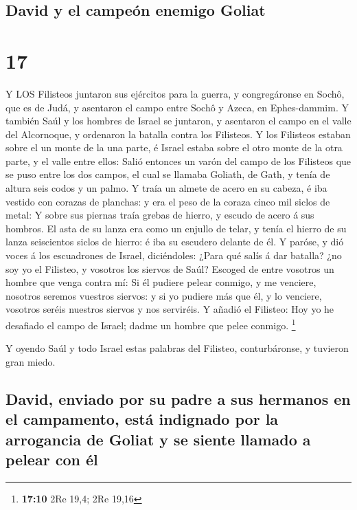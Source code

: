 \hypertarget{david-y-el-campeuxf3n-enemigo-goliat}{%
\subsection{David y el campeón enemigo
Goliat}\label{david-y-el-campeuxf3n-enemigo-goliat}}

\hypertarget{section-16}{%
\section{17}\label{section-16}}

 Y LOS Filisteos juntaron sus ejércitos para la guerra, y
congregáronse en Sochô, que es de Judá, y asentaron el campo entre Sochô
y Azeca, en Ephes-dammim.  Y también Saúl y los hombres de
Israel se juntaron, y asentaron el campo en el valle del Alcornoque, y
ordenaron la batalla contra los Filisteos.  Y los Filisteos
estaban sobre el un monte de la una parte, é Israel estaba sobre el otro
monte de la otra parte, y el valle entre ellos:  Salió
entonces un varón del campo de los Filisteos que se puso entre los dos
campos, el cual se llamaba Goliath, de Gath, y tenía de altura seis
codos y un palmo.  Y traía un almete de acero en su cabeza,
é iba vestido con corazas de planchas: y era el peso de la coraza cinco
mil siclos de metal:  Y sobre sus piernas traía grebas de
hierro, y escudo de acero á sus hombros.  El asta de su
lanza era como un enjullo de telar, y tenía el hierro de su lanza
seiscientos siclos de hierro: é iba su escudero delante de él.
 Y paróse, y dió voces á los escuadrones de Israel,
diciéndoles: ¿Para qué salís á dar batalla? ¿no soy yo el Filisteo, y
vosotros los siervos de Saúl? Escoged de entre vosotros un hombre que
venga contra mí:  Si él pudiere pelear conmigo, y me
venciere, nosotros seremos vuestros siervos: y si yo pudiere más que él,
y lo venciere, vosotros seréis nuestros siervos y nos serviréis.
 Y añadió el Filisteo: Hoy yo he desafiado el campo de
Israel; dadme un hombre que pelee conmigo. \footnote{\textbf{17:10} 2Re
  19,4; 2Re 19,16}

 Y oyendo Saúl y todo Israel estas palabras del Filisteo,
conturbáronse, y tuvieron gran miedo.

\hypertarget{david-enviado-por-su-padre-a-sus-hermanos-en-el-campamento-estuxe1-indignado-por-la-arrogancia-de-goliat-y-se-siente-llamado-a-pelear-con-uxe9l}{%
\subsection{David, enviado por su padre a sus hermanos en el campamento,
está indignado por la arrogancia de Goliat y se siente llamado a pelear
con
él}\label{david-enviado-por-su-padre-a-sus-hermanos-en-el-campamento-estuxe1-indignado-por-la-arrogancia-de-goliat-y-se-siente-llamado-a-pelear-con-uxe9l}}

